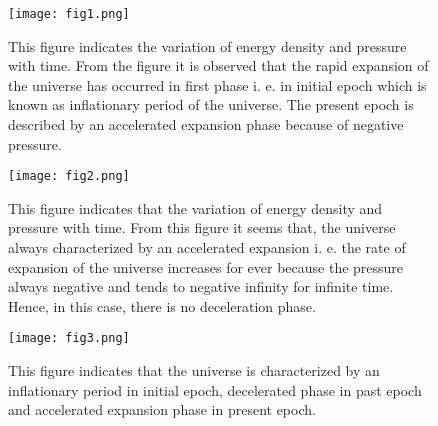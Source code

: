 \documentclass[11pt]{article}
\theoremstyle{theorem}
\theoremstyle{defi}
\begin{document}
\begin{figure}[ht!]
  \centering
  \texttt{[image: fig1.png]}
 \caption{This figure indicates the variation of energy density and pressure with time. From the figure it is observed that the rapid expansion
 of the universe has occurred in first phase i. e. in initial epoch which is known as inflationary period of the universe. The present epoch is described by an accelerated expansion phase because of negative pressure.}
\end{figure}

\begin{figure}[ht!]
  \centering
  \texttt{[image: fig2.png]}
 \caption{This figure indicates that the variation of energy density and pressure with time. From this figure it seems that, the universe always characterized by an accelerated expansion i. e. the rate of expansion of the universe increases for ever because the pressure always negative and tends to negative infinity for infinite time. Hence, in this case, there is no deceleration phase. }
\end{figure}

\begin{figure}[ht!]
  \centering
  \texttt{[image: fig3.png]}
 \caption{This figure indicates that the universe is characterized by an inflationary period in initial epoch, decelerated phase in past epoch and accelerated expansion phase in present epoch.}
\end{figure}
\end{document}
